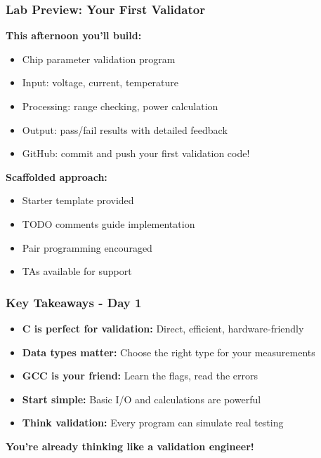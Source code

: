 \documentclass{beamer}
\begin{document}
\begin{frame}
\frametitle{Lab Preview: Your First Validator}
\textbf{This afternoon you'll build:}
\begin{itemize}
    \item Chip parameter validation program
    \item Input: voltage, current, temperature
    \item Processing: range checking, power calculation
    \item Output: pass/fail results with detailed feedback
    \item GitHub: commit and push your first validation code!
\end{itemize}

\vspace{0.5cm}
\textbf{Scaffolded approach:}
\begin{itemize}
    \item Starter template provided
    \item TODO comments guide implementation
    \item Pair programming encouraged
    \item TAs available for support
\end{itemize}
\end{frame}

\begin{frame}
\frametitle{Key Takeaways - Day 1}
\begin{itemize}
    \item \textbf{C is perfect for validation:} Direct, efficient, hardware-friendly
    \item \textbf{Data types matter:} Choose the right type for your measurements
    \item \textbf{GCC is your friend:} Learn the flags, read the errors
    \item \textbf{Start simple:} Basic I/O and calculations are powerful
    \item \textbf{Think validation:} Every program can simulate real testing
\end{itemize}

\vspace{0.5cm}
\begin{center}
\textbf{You're already thinking like a validation engineer!}
\end{center}
\end{frame}
\end{document}

